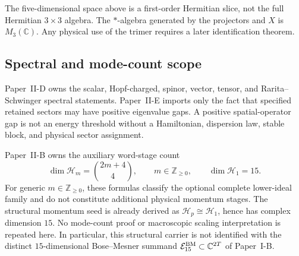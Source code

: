 \documentclass[12pt,a4paper]{article}
\begin{document}
\begin{remark}
\label{p2:rem:trimer-template-scope}
The five-dimensional space above is a first-order Hermitian slice, not the
full Hermitian \(3\times3\) algebra.  The \(*\)-algebra generated by the
projectors and \(X\) is \(M_3(\mathbb C)\).  Any physical use of the
trimer requires a later identification theorem.
\end{remark}

\subsection{Spectral and mode-count scope}
\label{p2:sec:spectral-gaps-threshold-closure}

Paper~II-D owns the scalar, Hopf-charged, spinor, vector, tensor, and
Rarita--Schwinger spectral statements.  Paper~II-E imports only the fact that
specified retained sectors may have positive eigenvalue gaps.  A positive
spatial-operator gap is not an energy threshold without a Hamiltonian,
dispersion law, stable block, and physical sector assignment.

Paper~II-B owns the auxiliary word-stage count
\[
        \dim\mathcal H_m=\binom{2m+4}{4},
        \qquad m\in\mathbb Z_{\ge0},\qquad
        \dim\mathcal H_1=15.
\]
For generic \(m\in\mathbb Z_{\ge0}\), these formulas classify the optional complete lower-ideal
family and do not constitute additional physical momentum stages.  The
structural momentum seed is already derived as
\(\mathcal H_p\cong\mathcal H_1\), hence has complex dimension \(15\).
No mode-count proof or macroscopic scaling interpretation is repeated here.
In particular, this structural carrier is not identified with the distinct
\(15\)-dimensional Bose--Mesner summand
\(\mathcal E_{15}^{\rm BM}\subset\mathbb C^{2T}\) of Paper~I-B.
\end{document}
